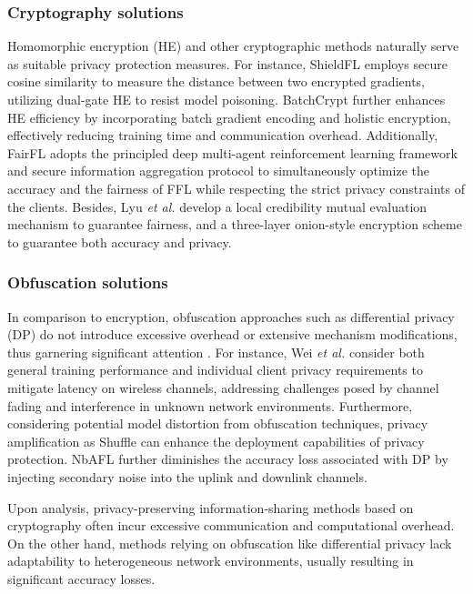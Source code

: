 \documentclass[lettersize,journal]{IEEEtran}
\begin{document}
\subsubsection{Cryptography solutions} 
Homomorphic encryption (HE) and other cryptographic methods naturally serve as suitable privacy protection measures. For instance, ShieldFL \cite{ma2022shieldfl} employs secure cosine similarity to measure the distance between two encrypted gradients, utilizing dual-gate HE to resist model poisoning. BatchCrypt \cite{zhang2020batchcrypt} further enhances HE efficiency by incorporating batch gradient encoding and holistic encryption, effectively reducing training time and communication overhead. Additionally, FairFL \cite{zhang2020fairfl} adopts the principled deep multi-agent reinforcement learning framework and secure information aggregation protocol to simultaneously optimize the accuracy and the fairness of FFL while respecting the strict privacy constraints of the clients. 
Besides, Lyu \textit{et al.} \cite{lyu2020towards} develop a local credibility mutual evaluation mechanism to guarantee fairness, and a three-layer onion-style encryption scheme to guarantee both accuracy and privacy. 
\subsubsection{Obfuscation solutions} 

In comparison to encryption, obfuscation approaches such as differential privacy (DP) do not introduce excessive overhead or extensive mechanism modifications, thus garnering significant attention \cite{padala2021federated}. For instance, Wei \textit{et al.} \cite{wei2021low} consider both general training performance and individual client privacy requirements to mitigate latency on wireless channels, addressing challenges posed by channel fading and interference in unknown network environments. Furthermore, considering potential model distortion from obfuscation techniques, privacy amplification as Shuffle \cite{girgis2021shuffled} can enhance the deployment capabilities of privacy protection. NbAFL \cite{wei2020federated-NbAFL} further diminishes the accuracy loss associated with DP by injecting secondary noise into the uplink and downlink channels.

Upon analysis, privacy-preserving information-sharing methods based on cryptography often incur excessive communication and computational overhead. On the other hand, methods relying on obfuscation like differential privacy lack adaptability to heterogeneous network environments, usually resulting in significant accuracy losses.
\end{document}
